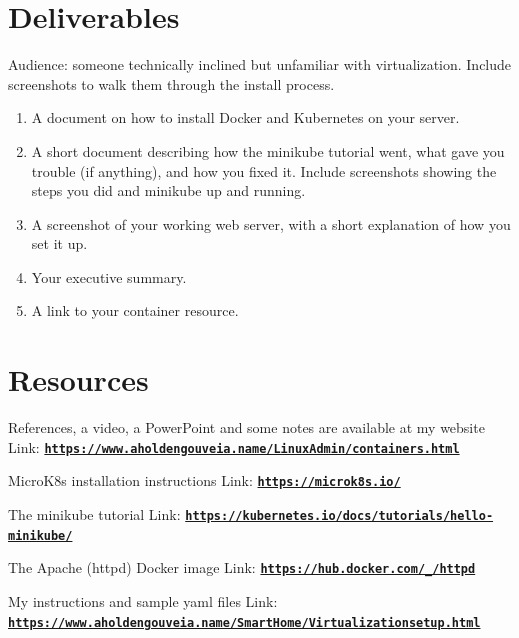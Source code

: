 \documentclass[12pt]{article}
\begin{document}
\section*{Deliverables}
Audience: someone technically inclined but unfamiliar with virtualization. Include screenshots to walk them through the install process.
\begin{enumerate}
    \item A document on how to install Docker and Kubernetes on your server.
    \item A short document describing how the minikube tutorial went, what gave you trouble (if anything), and how you fixed it. Include screenshots showing the steps you did and minikube up and running.
    \item A screenshot of your working web server, with a short explanation of how you set it up.
    \item Your executive summary.
    \item A link to your container resource.
\end{enumerate}

\section*{Resources}
References, a video, a PowerPoint and some notes are available at my website
Link: \href{https://www.aholdengouveia.name/LinuxAdmin/containers.html}{\textbf{\nolinkurl{https://www.aholdengouveia.name/LinuxAdmin/containers.html}}}

MicroK8s installation instructions
Link: \href{https://microk8s.io/}{\textbf{\nolinkurl{https://microk8s.io/}}}

The minikube tutorial
Link: \href{https://kubernetes.io/docs/tutorials/hello-minikube/}{\textbf{\nolinkurl{https://kubernetes.io/docs/tutorials/hello-minikube/}}}

The Apache (httpd) Docker image
Link: \href{https://hub.docker.com/_/httpd}{\textbf{\nolinkurl{https://hub.docker.com/_/httpd}}}

My instructions and sample yaml files
Link: \href{https://www.aholdengouveia.name/SmartHome/Virtualizationsetup.html}{\textbf{\nolinkurl{https://www.aholdengouveia.name/SmartHome/Virtualizationsetup.html}}}
\end{document}
